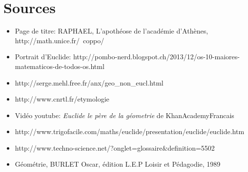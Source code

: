 \documentclass[a4paper,12pt]{article}
\begin{document}
\section{Sources}
\begin{itemize}
    \item Page de titre: RAPHAEL, L'apothéose de l'académie d'Athènes,\\ http://math.unice.fr/~coppo/
    \item Portrait d'Euclide: http://pombo-nerd.blogspot.ch/2013/12/os-10-maiores-matematicos-de-todos-os.html
    \item http://serge.mehl.free.fr/anx/geo\_non\_eucl.html
    \item http://www.cnrtl.fr/etymologie
    \item Vidéo youtube: \textit{Euclide le père de la géometrie} de KhanAcademyFrancais
    \item http://www.trigofacile.com/maths/euclide/presentation/euclide/euclide.htm
    \item http://www.techno-science.net/?onglet=glossaire\&definition=5502
    \item Géométrie, BURLET Oscar, édition L.E.P Loisir et Pédagodie, 1989
\end{itemize}
\end{document}
